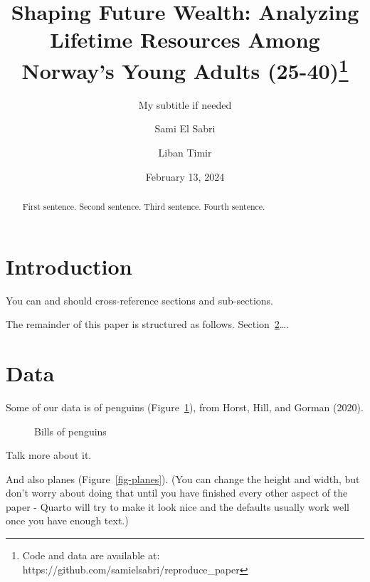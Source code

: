 \documentclass[
  letterpaper,
  DIV=11,
  numbers=noendperiod]{scrartcl}
\title{Shaping Future Wealth: Analyzing Lifetime Resources Among
Norway's Young Adults (25-40)\thanks{Code and data are available at:
https://github.com/samielsabri/reproduce\_paper}}
\subtitle{My subtitle if needed}
\author{Sami El Sabri \and Liban Timir}
\date{February 13, 2024}
\begin{document}
\maketitle
\begin{abstract}
First sentence. Second sentence. Third sentence. Fourth sentence.
\end{abstract}

\section{Introduction}\label{introduction}

You can and should cross-reference sections and sub-sections.

The remainder of this paper is structured as follows.
Section~\ref{sec-data}\ldots.

\section{Data}\label{sec-data}

Some of our data is of penguins (Figure~\ref{fig-bills}), from Horst,
Hill, and Gorman (2020).

\begin{figure}


\caption{\label{fig-bills}Bills of penguins}

\end{figure}%

Talk more about it.

And also planes (Figure~\ref{fig-planes}). (You can change the height
and width, but don't worry about doing that until you have finished
every other aspect of the paper - Quarto will try to make it look nice
and the defaults usually work well once you have enough text.)
\end{document}
